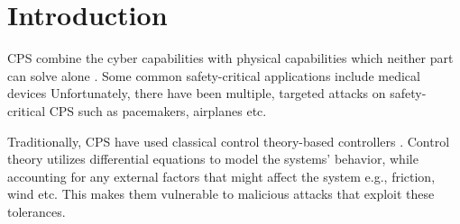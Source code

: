 
\chapter{Introduction }
\label{ch:Chapter1}
CPS combine the cyber capabilities with physical capabilities which neither part can solve alone \cite{Platzer18}. %
Some common safety-critical applications include medical devices \cite{10.1145/2038642.2038667} \cite{6051465} \cite{10.1145/2461328.2461369} \cite{Bresolin2015} %
Unfortunately, there have been multiple, targeted attacks on safety-critical CPS such as pacemakers\cite{4531149}, airplanes \cite{217595} etc.  %


Traditionally, CPS have used classical control theory-based controllers  \cite{1337806} \cite{10.1145/2038642.2038667} \cite{6051465}. Control theory utilizes differential equations to model the systems' behavior, while accounting for any external factors that might affect the system e.g., friction, wind etc. This makes them vulnerable to malicious attacks that exploit these tolerances.
%

